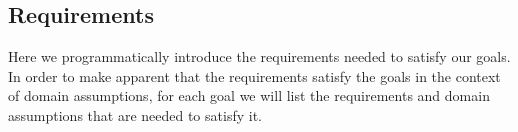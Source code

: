\subsection{Requirements}
Here we programmatically introduce the requirements needed to satisfy our goals.
In order to make apparent that the requirements satisfy the goals in the context
of domain assumptions, for each goal we will list the requirements and domain
assumptions that are needed to satisfy it.

\begin{description}
    \begin{description}
    \end{description}
    \begin{description}
    \end{description}
    \begin{description}
    \end{description}
    \begin{description}
    \end{description}
    \begin{description}
    \end{description}
    \begin{description}
    \end{description}
    \begin{description}
    \end{description}
\end{description}